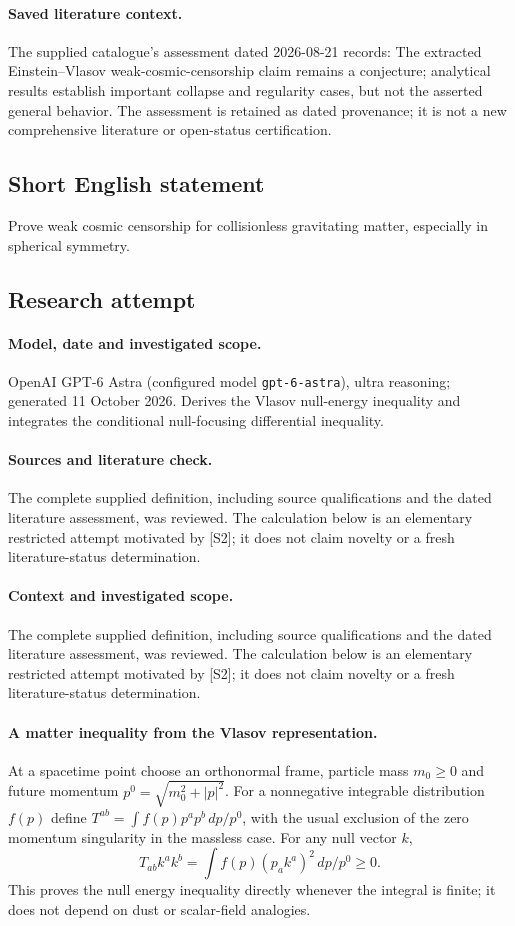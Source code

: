 \documentclass[11pt]{article}
\begin{document}
\paragraph{Saved literature context.} The supplied catalogue's assessment dated 2026-08-21 records: The extracted Einstein--Vlasov weak-cosmic-censorship claim remains a conjecture; analytical results establish important collapse and regularity cases, but not the asserted general behavior. The assessment is retained as dated provenance; it is not a new comprehensive literature or open-status certification.
\subsection{Short English statement}
Prove weak cosmic censorship for collisionless gravitating matter, especially in spherical symmetry.
\subsection{Research attempt}
\paragraph{Model, date and investigated scope.}
OpenAI GPT-6 Astra (configured model \texttt{gpt-6-astra}), ultra reasoning; generated 11 October 2026. Derives the Vlasov null-energy inequality and integrates the conditional null-focusing differential inequality.

\paragraph{Sources and literature check.}
The complete supplied definition, including source qualifications and the dated literature assessment, was reviewed. The calculation below is an elementary restricted attempt motivated by [S2]; it does not claim novelty or a fresh literature-status determination.

\paragraph{Context and investigated scope.} The complete supplied definition, including source qualifications and the dated literature assessment, was reviewed. The calculation below is an elementary restricted attempt motivated by [S2]; it does not claim novelty or a fresh literature-status determination.

\paragraph{A matter inequality from the Vlasov representation.} At a spacetime point choose an orthonormal frame, particle mass $m_0\geq0$ and future momentum $p^0=\sqrt{m_0^2+|p|^2}$. For a nonnegative integrable distribution $f(p)$ define $T^{ab}=\int f(p)p^ap^b\,dp/p^0$, with the usual exclusion of the zero momentum singularity in the massless case. For any null vector $k$,
\[
 T_{ab}k^ak^b=\int f(p)(p_ak^a)^2\,dp/p^0\geq0.
\]
This proves the null energy inequality directly whenever the integral is finite; it does not depend on dust or scalar-field analogies.
\end{document}
